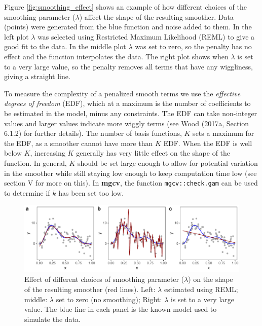 \documentclass[12pt]{article}
\begin{document}
Figure \ref{fig:smoothing_effect} shows an example of how different
choices of the smoothing parameter (\(\lambda\)) affect the shape of the
resulting smoother. Data (points) were generated from the blue function
and noise added to them. In the left plot \(\lambda\) was selected using
Restricted Maximum Likelihood (REML) to give a good fit to the data. In
the middle plot \(\lambda\) was set to zero, so the penalty has no
effect and the function interpolates the data. The right plot shows when
\(\lambda\) is set to a very large value, so the penalty removes all
terms that have any wiggliness, giving a straight line.

To measure the complexity of a penalized smooth terms we use the
\emph{effective degrees of freedom} (EDF), which at a maximum is the
number of coefficients to be estimated in the model, minus any
constraints. The EDF can take non-integer values and larger values
indicate more wiggly terms (see Wood (2017a, Section 6.1.2) for further
details). The number of basis functions, \(K\) sets a maximum for the
EDF, as a smoother cannot have more than \(K\) EDF. When the EDF is well
below \(K\), increasing \(K\) generally has very little effect on the
shape of the function. In general, \(K\) should be set large enough to
allow for potential variation in the smoother while still staying low
enough to keep computation time low (see section V for more on this). In
\textbf{mgcv}, the function \texttt{mgcv::check.gam} can be used to
determine if \(k\) has been set too low.

\begin{figure}
\includegraphics[width=\linewidth]{../figures/lambda-1} \caption{\label{fig:smoothing_effect}Effect of different choices of smoothing parameter ($\lambda$) on the shape of the resulting smoother (red lines). Left:  $\lambda$ estimated using REML; middle: $\lambda$ set to zero (no smoothing); Right: $\lambda$ is set to a very large value. The blue line in each panel is the known model used to simulate the data.}\label{fig:lambda}
\end{figure}
\end{document}
